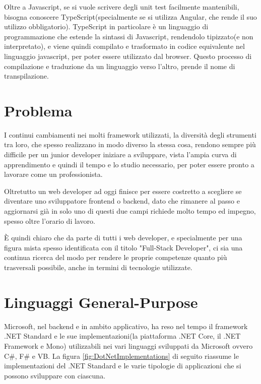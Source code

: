 Oltre a Javascript, se si vuole scrivere degli unit test facilmente mantenibili, bisogna conoscere TypeScript(specialmente se si utilizza Angular, che rende il suo utilizzo obbligatorio).
TypeScript in particolare \`e un linguaggio di programmazione che estende la sintassi di Javascript, rendendolo tipizzato(e non interpretato), e viene quindi compilato e trasformato in codice equivalente nel linguaggio javascript, per poter essere utilizzato dal browser.
Questo processo di compilazione e traduzione da un linguaggio verso l'altro, prende il nome di transpilazione.

\section{Problema}\label{sez:problema}
I continui cambiamenti nei molti framework utilizzati, la diversit\`a degli strumenti tra loro, che spesso realizzano in modo diverso la stessa cosa, rendono sempre pi\`u difficile per un junior developer iniziare a sviluppare, vista l'ampia curva di apprendimento e quindi il tempo e lo studio necessario, per poter essere pronto a lavorare come un professionista.

Oltretutto un web developer ad oggi finisce per essere costretto a scegliere se diventare uno sviluppatore frontend o backend, dato che rimanere al passo e aggiornarsi gi\`a in solo uno di questi due campi richiede molto tempo ed impegno, spesso oltre l'orario di lavoro.

\`E quindi chiaro che da parte di tutti i web developer, e specialmente per una figura mista spesso identificata con il titolo "Full-Stack Developer", ci sia una continua ricerca del modo per rendere le proprie competenze quanto pi\`u trasversali possibile, anche in termini di tecnologie utilizzate.

\pagebreak

\section{Linguaggi General-Purpose}\label{sez:linguaggiGeneralPurpose}
Microsoft, nel backend e in ambito applicativo, ha reso nel tempo il framework .NET Standard e le sue implementazioni(la piattaforma .NET Core, il .NET Framework e Mono) utilizzabili nei vari linguaggi sviluppati da Microsoft ovvero C\#, F\# e VB.
La figura \ref{fig:DotNetImplementations} di seguito riassume le implementazioni del .NET Standard e le varie tipologie di applicazioni che si possono sviluppare con ciascuna.

